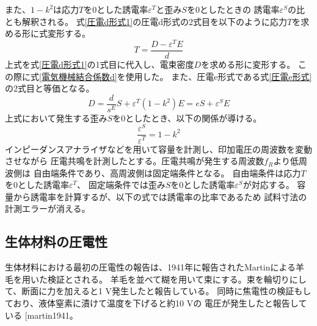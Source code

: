 \documentclass[dvipdfmx,12pt,a4paper]{jreport}
\makeatletter
\DeclareRobustCommand\cite{\unskip
    	\@ifnextchar[{\@tempswatrue\@citex}{\@tempswafalse\@citex[]}}
\makeatother
\begin{document}
			また、$1-k^2$は応力$T$を0とした誘電率$\varepsilon^T$と歪み$S$を0としたときの
			誘電率$\varepsilon^S$の比とも解釈される。
			式\ref{圧電d形式1}の圧電d形式の2式目を以下のように応力$T$を求める形に式変形する。			
			\begin{equation}
				T = \frac{D-\varepsilon^T E}{d}
			\end{equation}
			上式を式\ref{圧電d形式1}の1式目に代入し、電束密度$D$を求める形に変形する。
			この際に式\ref{電気機械結合係数d}を使用した。
			また、圧電e形式である式\ref{圧電e形式}の2式目と等価となる。
			\begin{equation}
				D = \frac{d}{s^E}S + \varepsilon^T\left(1-k^2\right)E
				  = e S + \varepsilon^S E
			\end{equation}
			上式において発生する歪み$S$を0としたとき、以下の関係が導ける。
			\begin{equation}
				\frac{\varepsilon^S}{\varepsilon^T}=1-k^2
			\end{equation}
			インピーダンスアナライザなどを用いて容量を計測し、印加電圧の周波数を変動させながら
			圧電共鳴を計測したとする。圧電共鳴が発生する周波数$f_R$より低周波側は
			自由端条件であり、高周波側は固定端条件となる。
			自由端条件は応力$T$を0とした誘電率$\varepsilon^T$、
			固定端条件では歪み$S$を0とした誘電率$\varepsilon^S$が対応する。
			容量から誘電率を計算するが、以下の式では誘電率の比率であるため
			試料寸法の計測エラーが消える。

			\newpage
			\subsection{生体材料の圧電性}
			生体材料における最初の圧電性の報告は、1941年に報告されたMartinによる羊毛を用いた検証とされる。
			羊毛を並べて糊を用いて束にする。束を輪切りにして、断面に力を加えると1 V発生したと報告している。
			同時に焦電性の検証もしており、液体窒素に漬けて温度を下げると約10 Vの
			電圧が発生したと報告している\cite{martin1941}。
\end{document}
